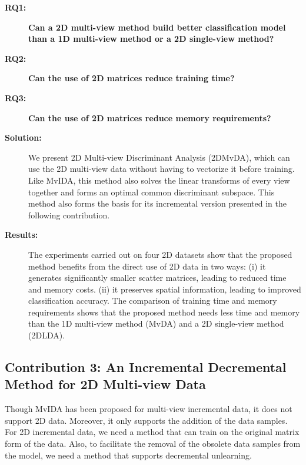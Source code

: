 \begin{description}
\item[\textbf{RQ1: }] \textbf{Can a 2D multi-view method build better classification model than a 1D multi-view method or a 2D single-view method?}

\item[\textbf{RQ2: }] \textbf{Can the use of 2D matrices reduce training time?}

\item[\textbf{RQ3: }] \textbf{Can the use of 2D matrices reduce memory requirements?}

\item[\textbf{Solution:}] We present 2D Multi-view Discriminant Analysis (2DMvDA), which can use the 2D multi-view data without having to vectorize it before training. Like MvIDA, this method also solves the linear transforms of every view together and forms an optimal common discriminant subspace. This method also forms the basis for its incremental version presented in the following contribution.

\item[\textbf{Results:}] The experiments carried out on four 2D datasets show that the proposed method benefits from the direct use of 2D data in two ways: (i) it generates significantly smaller scatter matrices, leading to reduced time and memory costs. (ii) it preserves spatial information, leading to improved classification accuracy. The comparison of training time and memory requirements shows that the proposed method needs less time and memory than the 1D multi-view method (MvDA) and a 2D single-view method (2DLDA).
\end{description}



\subsection{Contribution 3: An Incremental Decremental Method for 2D Multi-view Data}
Though MvIDA has been proposed for multi-view incremental data, it does not support 2D data. Moreover, it only supports the addition of the data samples. For 2D incremental data, we need a method that can train on the original matrix form of the data. Also, to facilitate the removal of the obsolete data samples from the model, we need a method that supports decremental unlearning.


